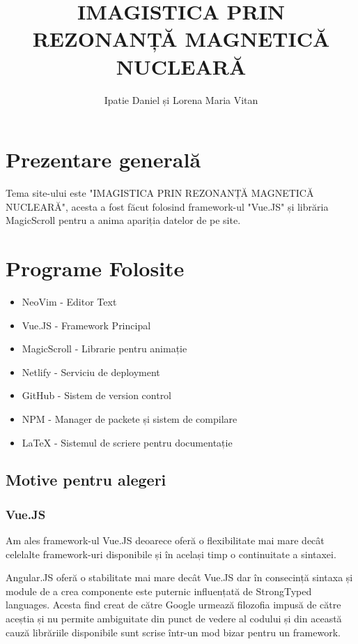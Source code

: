 \documentclass{article}
\author{Ipatie Daniel și Lorena Maria Vitan}
\title{IMAGISTICA PRIN REZONANȚĂ MAGNETICĂ NUCLEARĂ }
\date{}
\begin{document}
    \maketitle

    \section{Prezentare generală}

    Tema site-ului este "IMAGISTICA PRIN REZONANȚĂ MAGNETICĂ NUCLEARĂ", acesta a fost făcut folosind framework-ul "Vue.JS" și librăria MagicScroll pentru a anima apariția datelor de pe site.

    \section{Programe Folosite}

    \begin{itemize}
        
        \item NeoVim - Editor Text
        \item Vue.JS - Framework Principal
        \item MagicScroll - Librarie pentru animație
        \item Netlify - Serviciu de deployment
        \item GitHub - Sistem de version control
        \item NPM - Manager de packete și sistem de compilare
        \item {\LaTeX}  - Sistemul de scriere pentru documentație
        
    \end{itemize}


    \subsection{Motive pentru alegeri}

    \subsubsection{Vue.JS}
    Am ales framework-ul Vue.JS deoarece oferă o flexibilitate mai mare decât celelalte framework-uri disponibile și în același timp o continuitate a sintaxei.

    Angular.JS oferă o stabilitate mai mare decât Vue.JS dar în consecință sintaxa și module de a crea componente este puternic influențată de StrongTyped languages. Acesta find creat de către Google urmează filozofia impusă de către aceștia și nu permite ambiguitate din punct de vedere al codului și din această cauză librăriile disponibile sunt scrise într-un mod bizar pentru un framework.
\end{document}
